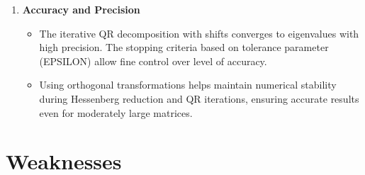 \documentclass[a4paper,11pt,oneside]{report}
\begin{document}
\begin{enumerate}
\item \textbf{Accuracy and Precision}
\begin{itemize}
    \item The iterative QR decomposition with shifts converges to eigenvalues with high precision. The stopping criteria based on tolerance parameter (EPSILON) allow fine control over level of accuracy.
    \item Using orthogonal transformations helps maintain numerical stability during Hessenberg reduction and QR iterations, ensuring accurate results even for moderately large matrices.
\end{itemize}
\end{enumerate}
\section{ Weaknesses}
\end{document}
